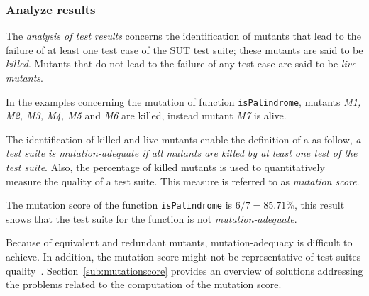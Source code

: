 \subsubsection{Analyze results}

The \emph{analysis of test results} concerns the identification of mutants that lead to the failure of at least one test case of the SUT test suite; these mutants are said to be \emph{killed}. Mutants that do not lead to the failure of any test case are said to be \emph{live mutants}. 

In the examples concerning the mutation of function \texttt{isPalindrome}, mutants \textit{M1, M2, M3, M4, M5} and \textit{M6} are killed, instead mutant \textit{M7} is alive.

The identification of killed and live mutants enable the definition of a  as follow, \emph{a test suite is mutation-adequate if all mutants are killed by at least one test of the test suite}. 
Also, the percentage of killed mutants is used to quantitatively measure the quality of a test suite. This measure is referred to as \emph{mutation score}.


The mutation score of the function \texttt{isPalindrome} is $6/7 = 85.71\%$, this result shows that the test suite for the function is not \textit{mutation-adequate}.

Because of equivalent and redundant mutants, mutation-adequacy is difficult to achieve. In addition, the mutation score might not be representative of test suites quality~\cite{papadakis2016threats}. Section~\ref{sub:mutationscore} provides an overview of solutions addressing the problems related to the computation of the mutation score.




